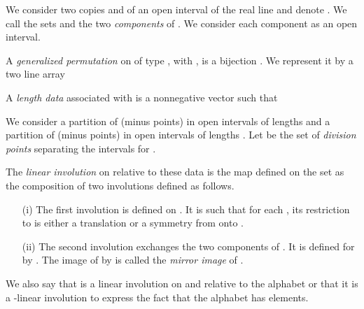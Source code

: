 \documentclass[preprint,12pt]{elsarticle}
\numberwithin{theorem}{section}
\numberwithin{equation}{section}
\numberwithin{figure}{section}
\numberwithin{table}{section}
\begin{document}
We consider two copies  and
 of an open interval  of the real line and denote  .
We call the sets  and  the two
\emph{components} of . We consider each component as an open interval.


A \emph{generalized permutation} on  of type , with ,
  is a bijection .
We represent it by a two line array

A \emph{length data} associated with  is a nonnegative
vector  such that


We consider a partition of  (minus 
points) in  open intervals
 of lengths 
and a partition of  (minus  points) in  open intervals
 of lengths . Let  be the set of  \emph{division points} separating
the intervals  for .


The \emph{linear involution} on  relative to these data is the
map  defined on the set
 as 
the composition
of two involutions defined as follows. 
\begin{enumerate}
\item[(i)]The first involution  is defined on .
It is such that for each , its restriction to 
is either a translation or a symmetry from  onto .

\item[(ii)]The second involution exchanges the two components of
  .
It  is defined for 
by . The image of  by 
is called the \emph{mirror image} of .
\end{enumerate}
We also say that  is a linear involution on  and relative to
 the alphabet 
or that it is a -linear involution to express the fact
that the alphabet  has  elements.
\end{document}
